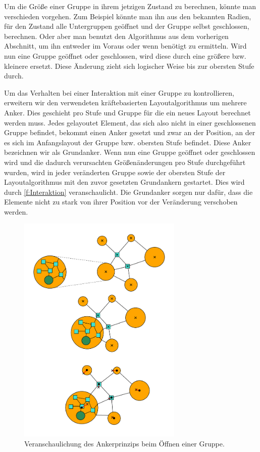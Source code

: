 Um die Größe einer Gruppe in ihrem jetzigen Zustand zu berechnen, könnte man verschieden vorgehen. 
Zum Beispiel könnte man ihn aus den bekannten Radien, für den Zustand alle Untergruppen geöffnet und der Gruppe selbst geschlossen, berechnen. 
Oder aber man benutzt den Algorithmus aus dem vorherigen Abschnitt, um ihn entweder im Voraus oder wenn benötigt zu ermitteln. 
Wird nun eine Gruppe geöffnet oder geschlossen, wird diese durch eine größere bzw. kleinere ersetzt. 
Diese Änderung zieht sich logischer Weise bis zur obersten Stufe durch.

Um das Verhalten bei einer Interaktion mit einer Gruppe zu kontrollieren, erweitern wir den verwendeten kräftebasierten Layoutalgorithmus um mehrere Anker. 
Dies geschieht pro Stufe und Gruppe für die ein neues Layout berechnet werden muss.
Jedes gelayoutet Element, das sich also nicht in einer geschlossenen Gruppe befindet, bekommt einen Anker gesetzt und zwar an der Position, 
an der es sich im Anfangslayout der Gruppe bzw. obersten Stufe befindet. 
Diese Anker bezeichnen wir als Grundanker. 
Wenn nun eine Gruppe geöffnet oder geschlossen wird und die dadurch verursachten Größenänderungen pro Stufe durchgeführt wurden, 
wird in jeder veränderten Gruppe sowie der obersten Stufe der Layoutalgorithmus mit den zuvor gesetzten Grundankern gestartet. 
Dies wird  durch \autoref{f:Interaktion} veranschaulicht. 
Die Grundanker sorgen nur dafür, dass die Elemente nicht zu stark von ihrer Position vor der Veränderung verschoben werden.

\begin{figure}[h!]
\begin{center} 
  \includegraphics[width=0.7\textwidth]{Pics/Interaktion.pdf}
  \caption{Veranschaulichung des Ankerprinzips beim Öffnen einer Gruppe.}
  \label{f:Interaktion}
\end{center}
\end{figure}


